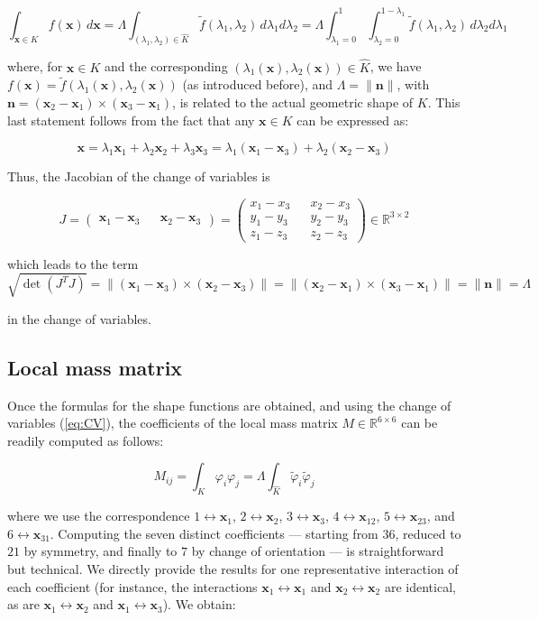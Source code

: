 \documentclass{article}
\theoremstyle{definition}
\theoremstyle{proposition}
\theoremstyle{theorem}
\theoremstyle{remark}
\theoremstyle{corollary}  %
\theoremstyle{exercise}
\theoremstyle{lemma}
\begin{document}
\begin{equation}\label{eq:CV}
\int_{\bm x \in K} f(\bm x) \, d\bm x = \Lambda \int_{(\lambda_1, \lambda_2) \in \hat{K}} \tilde{f}(\lambda_1, \lambda_2) \, d\lambda_1 d\lambda_2  = \Lambda \int_{\lambda_1 = 0} ^1 \int_{\lambda_2 = 0} ^{1-\lambda_1} \tilde{f}(\lambda_1, \lambda_2) \, d\lambda_2 d\lambda_1
\end{equation}

where, for $\bm x \in K$ and the corresponding $(\lambda_1(\bm x), \lambda_2(\bm x)) \in \hat{K}$, we have $f(\bm x) = \tilde{f}(\lambda_1(\bm x), \lambda_2(\bm x))$ (as introduced before), and $\Lambda = \|\bm n \|$, with $\bm n = (\bm x_2 - \bm x_1) \times (\bm x_3 - \bm x_1)$, is related to the actual geometric shape of $K$. This last statement follows from the fact that any $\bm x \in K$ can be expressed as:

$$\bm x = \lambda_1 \bm x_1 + \lambda_2 \bm x_2 + \lambda_3 \bm x_3 = \lambda_1(\bm x_1 - \bm x_3) + \lambda_2(\bm x_2 - \bm x_3) $$

Thus, the Jacobian of the change of variables is 

$$J = \begin{pmatrix}
    \bm x_1 - \bm x_3 && \bm x_2 - \bm x_3
\end{pmatrix} = \begin{pmatrix}
    x_1 - x_3 && x_2 - x_3 \\
    y_1 - y_3 && y_2 - y_3 \\
    z_1 - z_3 && z_2 - z_3
\end{pmatrix} \in \mathbb{R}^{3\times 2}$$

which leads to the term $$\sqrt{\det(J^TJ)} = \|(\bm x_1 - \bm x_3) \times (\bm x_2 - \bm x_3)\| = \| (\bm x_2 - \bm x_1) \times (\bm x_3 - \bm x_1) \| = \|\bm n\| = \Lambda $$

in the change of variables.

\subsection{Local mass matrix}

Once the formulas for the shape functions are obtained, and using the change of variables (\ref{eq:CV}), the coefficients of the local mass matrix $M \in \mathbb{R}^{6 \times 6}$ can be readily computed as follows:

$$M_{ij} = \int_{K} \varphi_i \varphi_j = \Lambda \int_{\hat{K}} \tilde{\varphi}_i \tilde{\varphi}_j$$

where we use the correspondence $1\leftrightarrow \bm x_1$, $2\leftrightarrow \bm x_2$, $3\leftrightarrow \bm x_3$, $4\leftrightarrow \bm x_{12}$, $5\leftrightarrow \bm x_{23}$, and $6\leftrightarrow \bm x_{31}$. Computing the seven distinct coefficients — starting from $36$, reduced to $21$ by symmetry, and finally to $7$ by change of orientation — is straightforward but technical. We directly provide the results for one representative interaction of each coefficient (for instance, the interactions $\bm x_1 \leftrightarrow \bm x_1$ and $\bm x_2 \leftrightarrow \bm x_2$ are identical, as are $\bm x_1 \leftrightarrow \bm x_2$ and $\bm x_1 \leftrightarrow \bm x_3$). We obtain:
\end{document}

